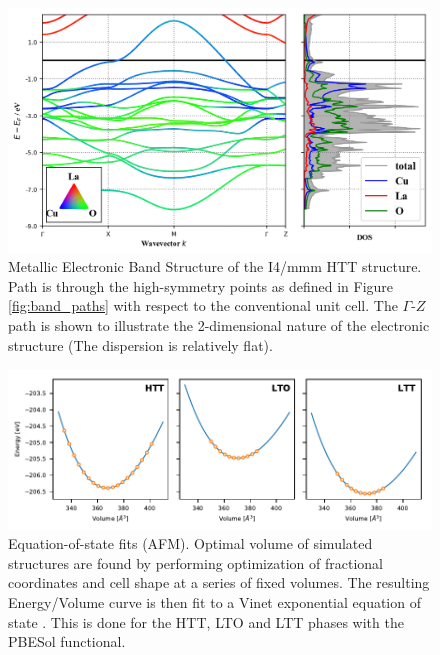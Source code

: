 \begin{figure}
    \centering
    \includegraphics[width=\textwidth]{fig/simulation/bs_metal.png}
    \caption[GGA: Metallic Electronic Band Structure]{Metallic Electronic Band Structure of the I4/mmm HTT structure. Path is through the high-symmetry points as defined in Figure \ref{fig:band_paths} with respect to the conventional unit cell. The $\Gamma$-$Z$ path is shown to illustrate the 2-dimensional nature of the electronic structure (The dispersion is relatively flat).}
    \label{fig:bs_metal}
\end{figure}

\begin{figure}
    \centering
    \includegraphics[width=\textwidth]{fig/simulation/eos_all.pdf}
    \caption[AFM: Equation-of-state fits]{Equation-of-state fits (AFM). Optimal volume of simulated structures are found by performing optimization of fractional coordinates and cell shape at a series of fixed volumes. The resulting Energy/Volume curve is then fit to a Vinet exponential equation of state \cite{Vinet1987}. This is done for the HTT, LTO and LTT phases with the PBESol functional.}
    \label{fig:eos_all}
\end{figure}

